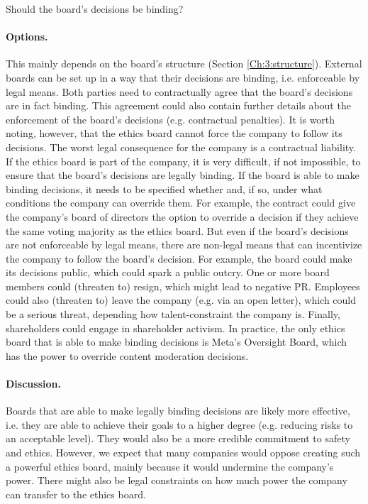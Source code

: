 \documentclass{article}
\begin{document}
Should the board’s decisions be binding?

\paragraph{Options.} This mainly depends on the board’s structure (Section \ref{Ch:3:structure}). External boards can be set up in a way that their decisions are binding, i.e. enforceable by legal means. Both parties need to contractually agree that the board’s decisions are in fact binding. This agreement could also contain further details about the enforcement of the board’s decisions (e.g. contractual penalties). It is worth noting, however, that the ethics board cannot force the company to follow its decisions. The worst legal consequence for the company is a contractual liability. If the ethics board is part of the company, it is very difficult, if not impossible, to ensure that the board’s decisions are legally binding. If the board is able to make binding decisions, it needs to be specified whether and, if so, under what conditions the company can override them. For example, the contract could give the company’s board of directors the option to override a decision if they achieve the same voting majority as the ethics board. But even if the board’s decisions are not enforceable by legal means, there are non-legal means that can incentivize the company to follow the board’s decision. For example, the board could make its decisions public, which could spark a public outcry. One or more board members could (threaten to) resign, which might lead to negative PR. Employees could also (threaten to) leave the company (e.g. via an open letter), which could be a serious threat, depending how talent-constraint the company is. Finally, shareholders could engage in shareholder activism. In practice, the only ethics board that is able to make binding decisions is Meta’s Oversight Board, which has the power to override content moderation decisions.

\paragraph{Discussion.} Boards that are able to make legally binding decisions are likely more effective, i.e. they are able to achieve their goals to a higher degree (e.g. reducing risks to an acceptable level). They would also be a more credible commitment to safety and ethics. However, we expect that many companies would oppose creating such a powerful ethics board, mainly because it would undermine the company’s power. There might also be legal constraints on how much power the company can transfer to the ethics board.
\end{document}
